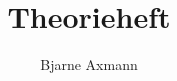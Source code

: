 \newcommand{\geogebra}[1]{Zu dem behandelten Thema steht eine digitale Visualisierung im Internet bereit.\href{#1}{\ExternalLink}}

\newcommand{\gtrvis}[1]{Der genaue Ablauf ist auf Youtube verfügbar.\href{#1}{\ExternalLink}}



\title{Theorieheft}
\author{Bjarne Axmann}

\newenvironment{beispiel}[1][]{
\vspace{0.5cm}
\textbf{\textit{Beispiel.}\em}%
\ifthenelse{\equal{#1}{}}{%
%
}{%

}
}{\hfill$\triangle$}
